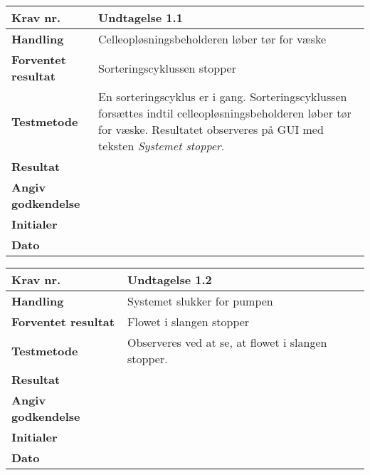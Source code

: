 \begin{center}
		\begin{longtable}{ | m{4cm}| m{8.5cm}|} 
			\hline
			\textbf{Krav nr.} & Undtagelse 1.1  \\ 
			\hline
			\textbf{Handling} & Celleopløsningsbeholderen løber tør for væske   \\
			\hline
			\textbf{Forventet resultat} & Sorteringscyklussen stopper \\
			\hline
			\textbf{Testmetode}  & En sorteringscyklus er i gang. Sorteringscyklussen forsættes indtil celleopløsningsbeholderen løber tør for væske. Resultatet observeres på GUI med teksten \textit{Systemet stopper}.  \\
			\hline
			\textbf{Resultat}  &    \\
			\hline
			\textbf{Angiv godkendelse} &     \\
			\hline
			\textbf{Initialer} &     \\
			\hline
			\textbf{Dato} &    \\
			\hline
		\end{longtable}
	\end{center}
	
\newpage	
			
	\begin{center}
		\begin{longtable}{ | m{4cm}| m{8.5cm}|} 
			\hline
			\textbf{Krav nr.} & Undtagelse 1.2  \\ 
			\hline
			\textbf{Handling} & Systemet slukker for pumpen   \\
			\hline
			\textbf{Forventet resultat} & Flowet i slangen stopper \\
			\hline
			\textbf{Testmetode}  & Observeres ved at se, at flowet i slangen stopper. \\
			\hline
			\textbf{Resultat}  &    \\
			\hline
			\textbf{Angiv godkendelse} &     \\
			\hline
			\textbf{Initialer} &     \\
			\hline
			\textbf{Dato} &    \\
			\hline
		\end{longtable}
	\end{center}
			

